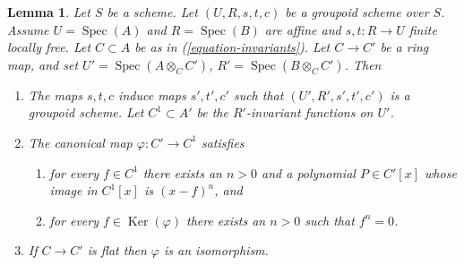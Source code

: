 \documentclass{amsart}
\theoremstyle{plain}
\newtheorem{lemma}[subsection]{Lemma}
\theoremstyle{definition}
\theoremstyle{remark}
\numberwithin{equation}{subsection}
\def\Spec{\mathop{\mathrm{Spec}}}
\def\Ker{\mathop{\mathrm{Ker}}}
\begin{document}
\begin{lemma}
\label{lemma-invariants-base-change}
Let $S$ be a scheme. Let $(U, R, s, t, c)$ be a groupoid scheme over $S$.
Assume $U = \Spec(A)$ and $R = \Spec(B)$ are affine and
$s, t : R \to U$ finite locally free. Let $C \subset A$ be as in
(\ref{equation-invariants}). Let $C \to C'$ be a ring map, and set
$U' = \Spec(A \otimes_C C')$,
$R' = \Spec(B \otimes_C C')$.
Then
\begin{enumerate}
\item The maps $s, t, c$ induce maps $s', t', c'$ such that
$(U', R', s', t', c')$ is a groupoid scheme. Let $C^1 \subset A'$
be the $R'$-invariant functions on $U'$.
\item The canonical map $\varphi : C' \to C^1$ satisfies
\begin{enumerate}
\item for every $f \in C^1$ there exists an $n > 0$ and a
polynomial $P \in C'[x]$ whose image in $C^1[x]$ is
$(x - f)^n$, and
\item for every $f \in \Ker(\varphi)$ there exists
an $n > 0$ such that $f^n = 0$.
\end{enumerate}
\item If $C \to C'$ is flat then $\varphi$ is an isomorphism.
\end{enumerate}
\end{lemma}
\end{document}
